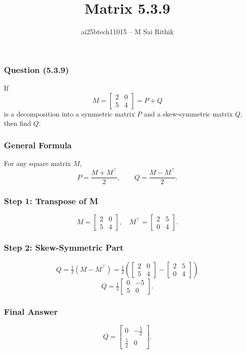 \documentclass{beamer}
\title{Matrix 5.3.9}
\author{ai25btech11015 -- M Sai Rithik}
\date{}
\begin{document}
\maketitle

\begin{frame}
\frametitle{Question (5.3.9)}
If 
\[
M = \begin{bmatrix} 2 & 0 \\ 5 & 4 \end{bmatrix} = P + Q
\]
is a decomposition into a symmetric matrix \(P\) and a skew-symmetric matrix \(Q\), then find \(Q\).
\end{frame}

\begin{frame}
\frametitle{General Formula}
For any square matrix \(M\),
\[
P = \frac{M + M^\top}{2}, \qquad 
Q = \frac{M - M^\top}{2}.
\]
\end{frame}

\begin{frame}
\frametitle{Step 1: Transpose of M}
\[
M = \begin{bmatrix} 2 & 0 \\ 5 & 4 \end{bmatrix}, \quad 
M^\top = \begin{bmatrix} 2 & 5 \\ 0 & 4 \end{bmatrix}.
\]
\end{frame}

\begin{frame}
\frametitle{Step 2: Skew-Symmetric Part}
\[
Q = \tfrac{1}{2}(M - M^\top)
= \tfrac{1}{2}\left(\begin{bmatrix} 2 & 0 \\ 5 & 4 \end{bmatrix} - \begin{bmatrix} 2 & 5 \\ 0 & 4 \end{bmatrix}\right)
\]
\[
Q = \tfrac{1}{2}\begin{bmatrix} 0 & -5 \\ 5 & 0 \end{bmatrix}.
\]
\end{frame}

\begin{frame}
\frametitle{Final Answer}
\[
Q = \begin{bmatrix} 0 & -\tfrac{5}{2} \\[6pt] \tfrac{5}{2} & 0 \end{bmatrix}.
\]
\end{frame}
\end{document}

